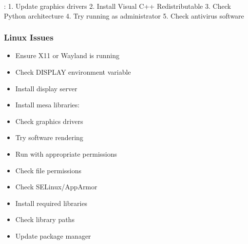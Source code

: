 \documentclass[a4paper,10pt,english,openany,oneside]{sphinxmanual}
\begin{document}
\sphinxAtStartPar
{}:
1. Update graphics drivers
2. Install Visual C++ Redistributable
3. Check Python architecture
4. Try running as administrator
5. Check antivirus software


\subsubsection{Linux Issues}
\label{\detokenize{troubleshooting:linux-issues}}\begin{description}
\begin{itemize}
\item {} 
\sphinxAtStartPar
Ensure X11 or Wayland is running

\item {} 
\sphinxAtStartPar
Check DISPLAY environment variable

\item {} 
\sphinxAtStartPar
Install display server

\end{itemize}

\begin{itemize}
\item {} 
\sphinxAtStartPar
Install mesa libraries: 

\item {} 
\sphinxAtStartPar
Check graphics drivers

\item {} 
\sphinxAtStartPar
Try software rendering

\end{itemize}

\begin{itemize}
\item {} 
\sphinxAtStartPar
Run with appropriate permissions

\item {} 
\sphinxAtStartPar
Check file permissions

\item {} 
\sphinxAtStartPar
Check SELinux/AppArmor

\end{itemize}

\begin{itemize}
\item {} 
\sphinxAtStartPar
Install required libraries

\item {} 
\sphinxAtStartPar
Check library paths

\item {} 
\sphinxAtStartPar
Update package manager

\end{itemize}

\end{description}
\end{document}
